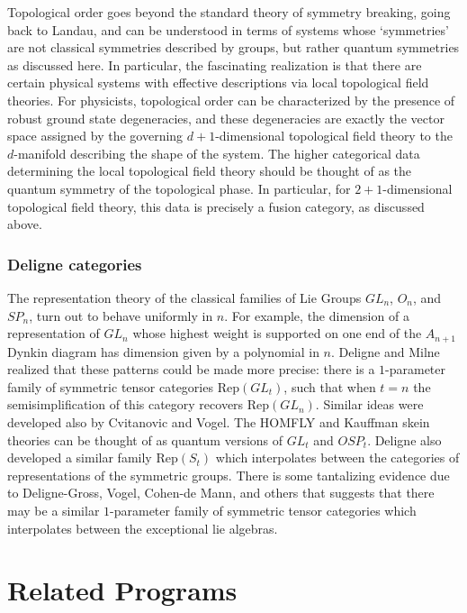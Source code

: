 \documentclass[11pt]{article}
\begin{document}
Topological order goes beyond the standard theory of symmetry breaking, going
back to Landau, and can be understood in terms of systems whose `symmetries'
are not classical symmetries described by groups, but rather quantum
symmetries as discussed here. In particular, the fascinating realization is
that there are certain physical systems with effective descriptions via local
topological field theories. For physicists, topological order can be
characterized by the presence of robust ground state degeneracies, and these
degeneracies are exactly the vector space assigned by the governing
$d+1$-dimensional topological field theory to the $d$-manifold describing the
shape of the system. The higher categorical data determining the local
topological field theory should be thought of as the quantum symmetry of the
topological phase. In particular, for $2+1$-dimensional topological field
theory, this data is precisely a fusion category, as discussed above.




\subsubsection{Deligne categories}
The representation theory of the classical families of Lie Groups $GL_n$, $O_n$, and $SP_n$, turn out to behave uniformly in $n$. For example, the dimension of a representation of $GL_n$ whose highest weight is supported on one end of the $A_{n+1}$ Dynkin diagram has dimension given by a polynomial in $n$. Deligne and Milne realized that these patterns could be made more precise: there is a $1$-parameter family of symmetric tensor categories $\mathrm{Rep}(GL_t)$, such that when $t=n$ the semisimplification of this category recovers $\mathrm{Rep}(GL_n)$. Similar ideas were developed also by Cvitanovic and Vogel. The HOMFLY and Kauffman skein theories can be thought of as quantum versions of $GL_t$ and $OSP_t$.  Deligne also developed a similar family $\mathrm{Rep}(S_t)$ which interpolates between the categories of representations of the symmetric groups. There is some tantalizing evidence due to Deligne-Gross, Vogel, Cohen-de Mann, and others that suggests that there may be a similar $1$-parameter family of symmetric tensor categories which interpolates between the exceptional lie algebras.

\section{Related Programs}
\end{document}
